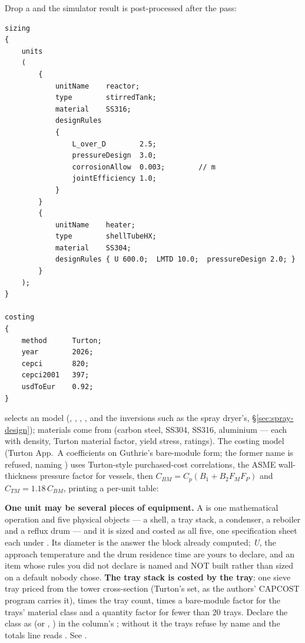 \documentclass[11pt,a4paper]{article}
\begin{document}
Drop a  and the simulator result is
post-processed after the pass:

\begin{lstlisting}[language=dict]
sizing
{
    units
    (
        {
            unitName    reactor;
            type        stirredTank;
            material    SS316;
            designRules
            {
                L_over_D        2.5;
                pressureDesign  3.0;
                corrosionAllow  0.003;        // m
                jointEfficiency 1.0;
            }
        }
        {
            unitName    heater;
            type        shellTubeHX;
            material    SS304;
            designRules { U 600.0;  LMTD 10.0;  pressureDesign 2.0; }
        }
    );
}

costing
{
    method      Turton;
    year        2026;
    cepci       820;
    cepci2001   397;
    usdToEur    0.92;
}
\end{lstlisting}

 selects an  model
(, , ,
, and the 
inversions such as the spray dryer's, \S\ref{sec:spray-design});
materials come from  (carbon steel,
SS304, SS316, aluminium --- each with density, Turton material factor,
yield stress, ratings).  The  costing model (Turton App.~A coefficients on Guthrie's bare-module form; the former name  is refused, naming ) uses
Turton-style purchased-cost correlations, the ASME wall-thickness
pressure factor for vessels, then
$C_{BM} = C_p (B_1 + B_2 F_M F_P)$ and $C_{TM} = 1.18\,C_{BM}$,
printing a per-unit table:

\textbf{One unit may be several pieces of equipment.} A
 is one mathematical operation and five physical
objects --- a shell, a tray stack, a condenser, a reboiler and a reflux drum
--- and it is sized and costed as all five, one specification sheet each under
. Its diameter is the answer the
 block already computed; \emph{U}, the approach
temperature and the drum residence time are yours to declare, and an item
whose rules you did not declare is named and NOT built rather than sized on a
default nobody chose. \textbf{The tray stack is costed by the tray}: one
sieve tray priced from the tower cross-section (Turton's set, as the authors'
CAPCOST program carries it), times the tray count, times a bare-module factor
for the trays' material class and a quantity factor for fewer than 20 trays.
Declare the class as  (or
, ) in the column's
; without it the trays refuse by name and the totals line
reads . See
.
\end{document}
